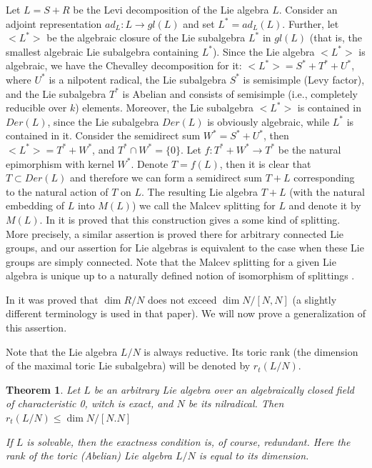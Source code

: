 \documentclass{amsart}
\newtheorem{theorem}{Theorem}
\begin{document}
Let $L=S+R$ be the Levi decomposition of the Lie algebra $L$. Consider an adjoint representation $ad_L : L \to gl(L)$ and set $L^\ast =ad_L(L)$. Further, let $<L^\ast>$ be the algebraic closure of the Lie subalgebra $L^\ast$ in $gl(L)$ (that is, the smallest algebraic Lie subalgebra containing $L^\ast$). Since the Lie algebra $<L^\ast>$ is algebraic, we have the Chevalley decomposition for it: $<L^\ast> = S^\ast +T^\ast+U^\ast$, where $U^\ast $ is a nilpotent radical, the Lie subalgebra $S^\ast$ is semisimple (Levy factor), and the Lie subalgebra $T^\ast$ is Abelian and consists of semisimple (i.e., completely reducible over $k$) elements.
Moreover, the Lie subalgebra $<L^\ast>$ is contained in $Der(L)$, since the Lie subalgebra $Der(L)$ is obviously algebraic, while $L^\ast$ is contained in it.
Consider the semidirect sum $W^\ast=S^\ast +U^\ast$, then $<L^\ast> = T^\ast+W^\ast$, and $T^\ast \cap W^ \ast = \{ 0 \}$. Let $f : T^\ast+W^\ast \to T^\ast$ be the natural epimorphism with kernel $W^\ast$. Denote $T=f(L)$, then it is clear that $T \subset Der(L)$ and therefore we can form a semidirect sum $T+L$ corresponding to the natural action of $T$ on $L$. The resulting Lie algebra $T+L$ (with the natural embedding of $L$ into $M(L)$) we call the Malcev splitting for $L$ and denote it by $M(L)$. In \cite {G1} it is proved that this construction gives a some kind of splitting. More precisely, a similar assertion is proved there for arbitrary connected Lie groups, and our assertion for Lie algebras is equivalent to the case when these Lie groups are simply connected. Note that the Malcev splitting for a given Lie algebra is unique up to a naturally defined notion of isomorphism of splittings \cite {G1}.


In \cite {Sn} it was proved that $\dim R/N$ does not exceed $\dim{N/[N,N]}$ (a slightly different terminology is used in that paper). We will now prove a generalization of this assertion.

Note that the Lie algebra $L/N$ is always reductive. Its toric rank (the dimension of the maximal toric Lie subalgebra) will be denoted by $r_t(L/N)$.

\begin{theorem} Let $L$ be an arbitrary Lie algebra over an algebraically closed field of characteristic 0, witch is exact, and $N$ be its nilradical.
Then $r_t(L/N) \le \dim N/[N.N]$

If $L$ is solvable, then the exactness condition is, of course, redundant. Here the rank of the toric (Abelian) Lie algebra $L/N$ is equal to its dimension.
\end{theorem}
\end{document}
